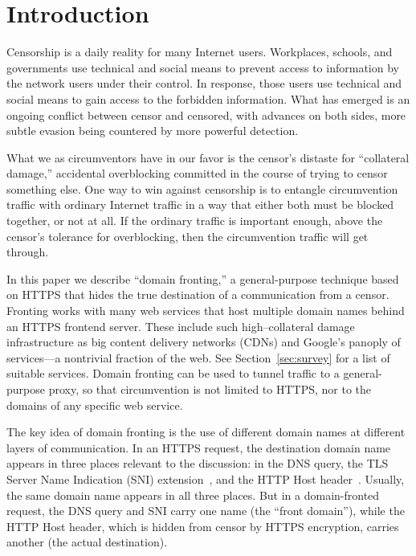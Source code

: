 \documentclass[conference]{IEEEtran}
\begin{document}
\section{Introduction}


Censorship is a daily reality for many Internet users.
Workplaces, schools, and governments use technical and social means
to prevent access to information by the network users under their control.
In response, those users use technical and social means
to gain access to the forbidden information.
What has emerged is an ongoing conflict between censor and censored,
with advances on both sides, more subtle evasion being countered by more powerful detection.

What we as circumventors have in our favor is the censor's
distaste for ``collateral damage,''
accidental overblocking committed in the course of trying to censor something else.
One way to win against censorship is to entangle circumvention traffic
with ordinary Internet traffic in a way that either both must be blocked together,
or not at all.
If the ordinary traffic is important enough,
above the censor's tolerance for overblocking,
then the circumvention traffic will get through.

In this paper we describe ``domain fronting,'' a general-purpose technique
based on HTTPS that hides the true destination of a communication
from a censor.
Fronting works with many web services that host multiple domain names
behind an HTTPS frontend server.
These include such high--collateral damage infrastructure as
big content delivery networks (CDNs)
and Google's panoply of services---a nontrivial fraction of the web.
See Section~\ref{sec:survey} for a list of suitable services.
Domain fronting can be used to tunnel traffic
to a general-purpose proxy,
so that circumvention is not limited to HTTPS, nor to the domains of any specific web service.

The key idea of domain fronting is the use of
different domain names at different layers of communication.
In an HTTPS request, the destination domain name appears
in three places relevant to the discussion:
in the DNS query,
the TLS Server Name Indication (SNI) extension~\cite[Section~3]{rfc6066},
and the HTTP Host header~\cite[Section~14.23]{rfc2616}.
Usually, the same domain name appears in all three places.
But in a domain-fronted request,
the DNS query and SNI carry one name (the ``front domain''),
while the HTTP Host header,
which is hidden from censor by HTTPS encryption,
carries another (the actual destination).
\end{document}
